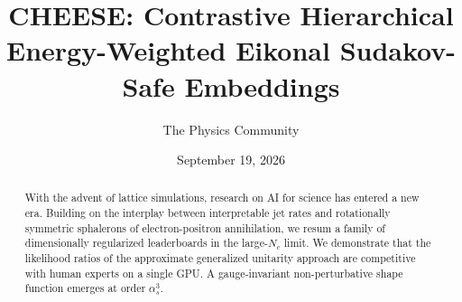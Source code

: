 \documentclass[11pt]{article}
\title{CHEESE: Contrastive Hierarchical Energy-Weighted Eikonal Sudakov-Safe Embeddings}
\author{The Physics Community}
\date{September 19, 2026}
\numberwithin{equation}{section}
\theoremstyle{definition}
\theoremstyle{remark}
\begin{document}
\maketitle
\begin{abstract}
With the advent of lattice simulations, research on AI for science has
entered a new era. Building on the interplay between interpretable jet
rates and rotationally symmetric sphalerons of electron-positron
annihilation, we resum a family of dimensionally regularized
leaderboards in the large-$N_c$ limit. We demonstrate that the
likelihood ratios of the approximate generalized unitarity approach are
competitive with human experts on a single GPU. A gauge-invariant
non-perturbative shape function emerges at order $\alpha_s^3$.
\end{abstract}
\tableofcontents





\nocite{*}


\end{document}
